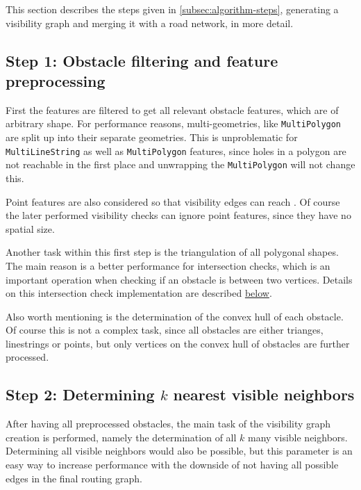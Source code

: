 	This section describes the steps given in \cref{subsec:algorithm-steps}, generating a visibility graph and merging it with a road network, in more detail.

	\subsection{Step 1: Obstacle filtering and feature preprocessing}
	\label{subsec:step-1-preprocessing}
			
			First the features are filtered to get all relevant obstacle features, which are of arbitrary shape.
			For performance reasons, multi-geometries, like \texttt{MultiPolygon} are split up into their separate geometries.
			This is unproblematic for \texttt{MultiLineString} as well as \texttt{MultiPolygon} features, since holes in a polygon are not reachable in the first place and unwrapping the \texttt{MultiPolygon} will not change this.
			
			Point features are also considered so that visibility edges can reach .
			Of course the later performed visibility checks can ignore point features, since they have no spatial size.
			
			Another task within this first step is the triangulation of all polygonal shapes.
			The main reason is a better performance for intersection checks, which is an important operation when checking if an obstacle is between two vertices.
			Details on this intersection check implementation are described \hyperref[subsubsec:intersection-checks]{below}.
			
			Also worth mentioning is the determination of the convex hull of each obstacle.
			Of course this is not a complex task, since all obstacles are either trianges, linestrings or points, but only vertices on the convex hull of obstacles are further processed.
			
	\subsection{Step 2: Determining $k$ nearest visible neighbors}
			
			After having all preprocessed obstacles, the main task of the visibility graph creation is performed, namely the determination of all $k$ many visible neighbors.
			Determining all visible neighbors would also be possible, but this parameter is an easy way to increase performance with the downside of not having all possible edges in the final routing graph.
			

